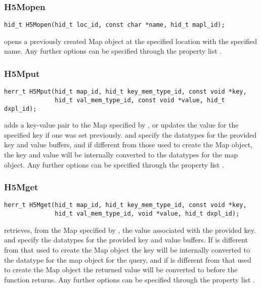 \documentclass[../design_doc.tex]{subfiles}
\begin{document}
\subsubsection{H5Mopen}

\begin{verbatim}
hid_t H5Mopen(hid_t loc_id, const char *name, hid_t mapl_id);
\end{verbatim}

 opens a previously created Map object at the specified location with the specified name. Any further options can be specified through the property list .

\subsubsection{H5Mput}

\begin{verbatim}
herr_t H5Mput(hid_t map_id, hid_t key_mem_type_id, const void *key,
              hid_t val_mem_type_id, const void *value, hid_t dxpl_id);
\end{verbatim}

 adds a key-value pair to the Map specified by , or updates the value for the specified key if one was set previously.  and  specify the datatypes for the provided key and value buffers, and if different from those used to create the Map object, the key and value will be internally converted to the datatypes for the map object. Any further options can be specified through the property list .

\subsubsection{H5Mget}

\begin{verbatim}
herr_t H5Mget(hid_t map_id, hid_t key_mem_type_id, const void *key,
              hid_t val_mem_type_id, void *value, hid_t dxpl_id);
\end{verbatim}

 retrieves, from the Map specified by , the value associated with the provided key.  and  specify the datatypes for the provided key and value buffers. If  is different from that used to create the Map object the key will be internally converted to the datatype for the map object for the query, and if  is different from that used to create the Map object the returned value will be converted to  before the function returns. Any further options can be specified through the property list .
\end{document}
